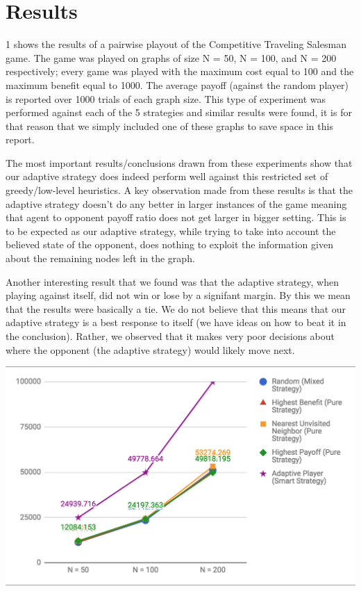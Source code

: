 \documentclass[pageno]{jpaper}
\begin{document}
\section{Results}

\figurename{1} shows the results of a pairwise playout of the Competitive Traveling Salesman game. The game was played on graphs of size N = 50, N = 100, and N = 200 respectively; every game was played with the maximum cost equal to 100 and the maximum benefit equal to 1000. The average payoff (against the random player) is reported over 1000 trials of each graph size. This type of experiment was performed against each of the 5 strategies and similar results were found, it is for that reason that we simply included one of these graphs to save space in this report.\par
The most important results/conclusions drawn from these experiments show that our adaptive strategy does indeed perform well against this restricted set of greedy/low-level heuristics. A key observation made from these results is that the adaptive strategy doesn't do any better in larger instances of the game meaning that agent to opponent payoff ratio does not get larger in bigger setting. This is to be expected as our adaptive strategy, while trying to take into account the believed state of the opponent, does nothing to exploit the information given about the remaining nodes left in the graph.\par
Another interesting result that we found was that the adaptive strategy, when playing against itself, did not win or lose by a signifant margin. By this we mean that the results were basically a tie. We do not believe that this means that our adaptive strategy is a best response to itself (we have ideas on how to beat it in the conclusion). Rather, we observed that it makes very poor decisions about where the opponent (the adaptive strategy) would likely move next. 

\includegraphics[angle=90, origin=c, width=.90\linewidth]{Results1.png}
\end{document}
